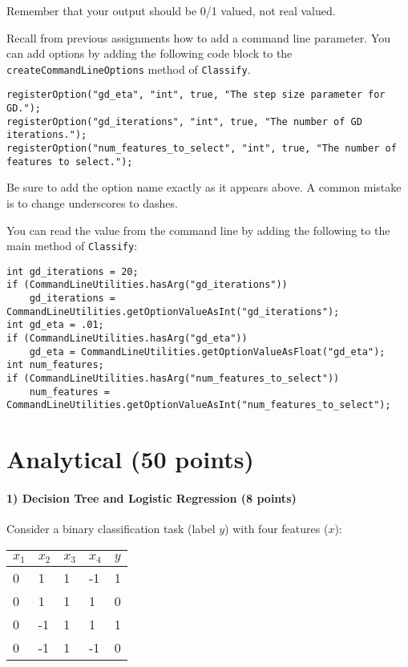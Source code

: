 \documentclass[11pt]{article}
\begin{document}
Remember that your output should be 0/1 valued, not real valued.

Recall from previous assignments how to add a command line parameter. You can add options by adding the following 
code block to the {\tt createCommandLineOptions} method of {\tt Classify}.
\begin{footnotesize}
\begin{verbatim}
registerOption("gd_eta", "int", true, "The step size parameter for GD.");
registerOption("gd_iterations", "int", true, "The number of GD iterations.");
registerOption("num_features_to_select", "int", true, "The number of features to select.");
\end{verbatim}
\end{footnotesize}

Be sure to add the option name exactly as it appears above. A common mistake is to change underscores to dashes.

You can read the value from the command line by adding the following to the main method of {\tt Classify}:
\begin{footnotesize}
\begin{verbatim}
int gd_iterations = 20;
if (CommandLineUtilities.hasArg("gd_iterations"))
    gd_iterations = CommandLineUtilities.getOptionValueAsInt("gd_iterations");
int gd_eta = .01;
if (CommandLineUtilities.hasArg("gd_eta"))
    gd_eta = CommandLineUtilities.getOptionValueAsFloat("gd_eta");
int num_features; 
if (CommandLineUtilities.hasArg("num_features_to_select"))
    num_features = CommandLineUtilities.getOptionValueAsInt("num_features_to_select");
\end{verbatim}

\end{footnotesize}


\section{Analytical (50 points)}

\paragraph{1) Decision Tree and Logistic Regression (8 points)}
Consider a binary classification task (label $y$) with four features ($x$):

\begin{tabular}{ |l|l|l|l|l| }
\hline
$x_1$ & $x_2$ & $x_3$ & $x_4$ & $y$ \\
\hline
 0& 1 & 1& -1 & 1 \\
 0&  1 & 1& 1 & 0 \\
 0&  -1 & 1& 1 & 1 \\
 0&  -1 & 1& -1 & 0 \\
\hline
\end{tabular}
\end{document}
